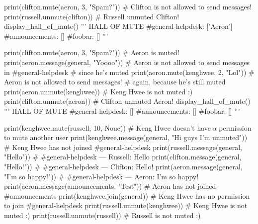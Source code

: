 \begin{python}
print(clifton.mute(aeron, 3, "Spam?"))      # Clifton is not allowed to send messages!
print(russell.unmute(clifton))              # Russell unmuted Clifton!
display_hall_of_mute()
'''
HALL OF MUTE
#general-helpdesk: ['Aeron']
#announcements: []
#foobar: []
'''

print(clifton.mute(aeron, 3, "Spam?"))      # Aeron is muted!
print(aeron.message(general, "Yoooo"))      # Aeron is not allowed to send messages in #general-helpdesk
                                            # since he's muted
print(aeron.mute(kenghwee, 2, "Lol"))       # Aeron is not allowed to send messages!
                                            # again, because he's still muted
print(aeron.unmute(kenghwee))               # Keng Hwee is not muted :)
print(clifton.unmute(aeron))                # Clifton unmuted Aeron!
display_hall_of_mute()
'''
HALL OF MUTE
#general-helpdesk: []
#announcements: []
#foobar: []
'''

print(kenghwee.mute(russell, 10, None))                     # Keng Hwee doesn't have a permission to mute another user
print(kenghwee.message(general, "Hi guys I'm unmuted"))     # Keng Hwee has not joined #general-helpdesk
print(russell.message(general, "Hello"))                    # #general-helpdesk --- Russell: Hello
print(clifton.message(general, "Hello!"))                   # #general-helpdesk --- Clifton: Hello!
print(aeron.message(general, "I'm so happy!"))              # #general-helpdesk --- Aeron: I'm so happy!
print(aeron.message(announcements, "Test"))                 # Aeron has not joined #announcements
print(kenghwee.join(general))                               # Keng Hwee has no permission to join #general-helpdesk
print(russell.unmute(kenghwee))                             # Keng Hwee is not muted :)
print(russell.unmute(russell))                              # Russell is not muted :)
\end{python}
